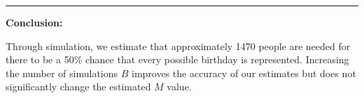\documentclass[
  letterpaper,
  DIV=11,
  numbers=noendperiod]{scrartcl}
\begin{document}
\begin{center}\rule{0.5\linewidth}{0.5pt}\end{center}

\textbf{Conclusion:}

Through simulation, we estimate that approximately 1470 people are
needed for there to be a 50\% chance that every possible birthday is
represented. Increasing the number of simulations \(B\) improves the
accuracy of our estimates but does not significantly change the
estimated \(M\) value.
\end{document}
